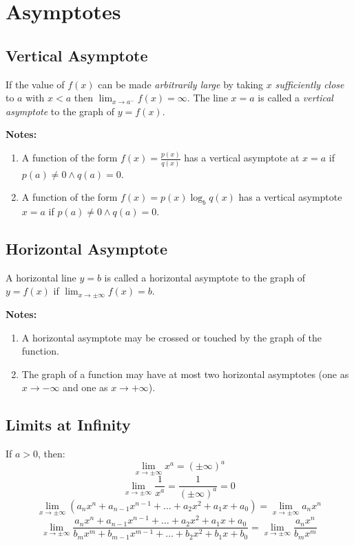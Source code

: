 \section{Asymptotes}
\subsection{Vertical Asymptote}
	If the value of $f(x)$ can be made \emph{arbitrarily large} by taking $x$ \emph{sufficiently close} to $a$ with $x < a$ then $\displaystyle \lim_{x \to a^-} f(x) = \infty$. The line $x=a$ is called a \emph{vertical asymptote} to the graph of $y=f(x)$.

	\textbf{Notes:}
	\begin{enumerate}
		\item A function of the form $f(x) = \frac{p(x)}{q(x)}$ has a vertical asymptote at $x=a$ if $p(a) \neq 0 \land q(a) = 0$.
		\item A function of the form $f(x) = p(x)\log_b q(x)$ has a vertical asymptote $x=a$ if $p(a) \neq 0 \land q(a) = 0$.
	\end{enumerate}
\subsection{Horizontal Asymptote}
	A horizontal line $y=b$ is called a horizontal asymptote to the graph of $y=f(x)$ if $\displaystyle \lim_{x \to \pm\infty}f(x) = b$.

	\textbf{Notes:}
	\begin{enumerate}
		\item A horizontal asymptote may be crossed or touched by the graph of the function.
		\item The graph of a function may have at most two horizontal asymptotes (one as $x \to -\infty$ and one as $x \to +\infty$).
	\end{enumerate}
\subsection{Limits at Infinity}
	If $a > 0$, then:
	\[\lim_{x \to \pm\infty} x^a = (\pm\infty)^a\]
	\[\lim_{x \to \pm\infty} \frac{1}{x^a} = \frac{1}{(\pm\infty)^a} = 0\]
	\[\lim_{x \to \pm\infty} (a_nx^n + a_{n-1}x^{n-1} + \dots + a_2x^2 + a_1x + a_0) = \lim_{x \to \pm\infty} a_nx^n\]
	\[\lim_{x \to \pm\infty} \frac{a_nx^n + a_{n-1}x^{n-1} + \dots + a_2x^2 + a_1x + a_0}{b_mx^m + b_{m-1}x^{m-1} + \dots + b_2x^2 + b_1x + b_0} = \lim_{x \to \pm\infty} \frac{a_nx^n}{b_mx^m}\]

